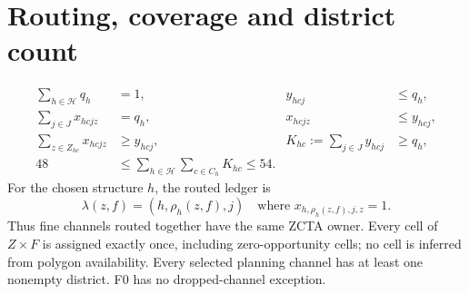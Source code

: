 \documentclass[11pt,letterpaper]{article}
\begin{document}
\section{Routing, coverage and district count}
\begin{equation}\label{eq:coverage}
\begin{aligned}
 \sum_{h\in\mathcal H}q_h&=1,& y_{hcj}&\le q_h,\\
 \sum_{j\in J}x_{hcjz}&=q_h,& x_{hcjz}&\le y_{hcj},\\
 \sum_{z\in Z_{hc}}x_{hcjz}&\ge y_{hcj},&
 K_{hc}:=\sum_{j\in J}y_{hcj}&\ge q_h,\\
 48&\le\sum_{h\in\mathcal H}\sum_{c\in C_h}K_{hc}\le54.
\end{aligned}
\end{equation}
For the chosen structure $h$, the routed ledger is
\begin{equation}\label{eq:ledger}
 \lambda(z,f)=(h,\rho_h(z,f),j)
 \quad\text{where }x_{h,\rho_h(z,f),j,z}=1.
\end{equation}
Thus fine channels routed together have the same ZCTA owner. Every cell of
$Z\times F$ is assigned exactly once, including zero-opportunity cells;
no cell is inferred from polygon availability. Every selected planning
channel has at least one nonempty district. F0 has no dropped-channel exception.
\end{document}
